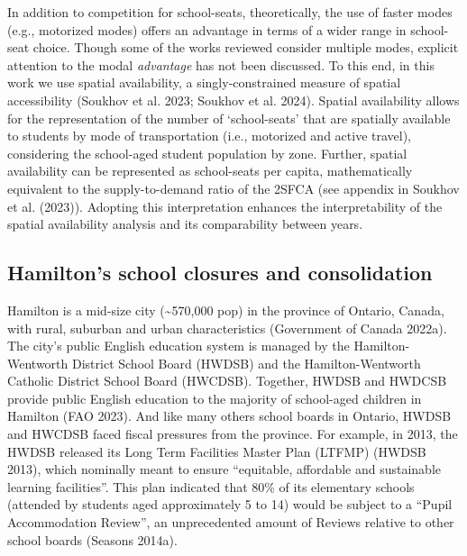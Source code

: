 \documentclass[
default
]{sn-jnl}
\begin{document}
In addition to competition for school-seats, theoretically, the use of
faster modes (e.g., motorized modes) offers an advantage in terms of a
wider range in school-seat choice. Though some of the works reviewed
consider multiple modes, explicit attention to the modal
\emph{advantage} has not been discussed. To this end, in this work we
use spatial availability, a singly-constrained measure of spatial
accessibility (Soukhov et al. 2023; Soukhov et al. 2024). Spatial
availability allows for the representation of the number of
`school-seats' that are spatially available to students by mode of
transportation (i.e., motorized and active travel), considering the
school-aged student population by zone. Further, spatial availability
can be represented as school-seats per capita, mathematically equivalent
to the supply-to-demand ratio of the 2SFCA (see appendix in Soukhov et
al. (2023)). Adopting this interpretation enhances the interpretability
of the spatial availability analysis and its comparability between
years.

\subsection{Hamilton's school closures and
consolidation}\label{hamiltons-school-closures-and-consolidation}

Hamilton is a mid-size city (\textasciitilde570,000 pop) in the province
of Ontario, Canada, with rural, suburban and urban characteristics
(Government of Canada 2022a). The city's public English education system
is managed by the Hamilton-Wentworth District School Board (HWDSB) and
the Hamilton-Wentworth Catholic District School Board (HWCDSB).
Together, HWDSB and HWDCSB provide public English education to the
majority of school-aged children in Hamilton (FAO 2023). And like many
others school boards in Ontario, HWDSB and HWCDSB faced fiscal pressures
from the province. For example, in 2013, the HWDSB released its Long
Term Facilities Master Plan (LTFMP) (HWDSB 2013), which nominally meant
to ensure ``equitable, affordable and sustainable learning facilities''.
This plan indicated that 80\% of its elementary schools (attended by
students aged approximately 5 to 14) would be subject to a ``Pupil
Accommodation Review'', an unprecedented amount of Reviews relative to
other school boards (Seasons 2014a).
\end{document}
